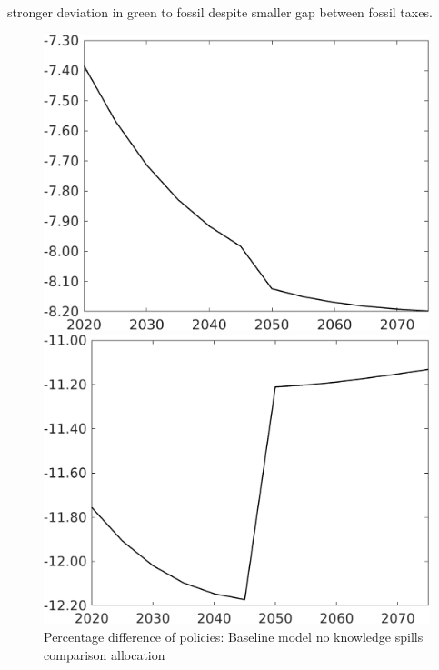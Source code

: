 \documentclass[12pt]{article}
\begin{document}
stronger deviation in green to fossil despite smaller gap between fossil taxes. 
\begin{figure}[h!!]
	\centering
	\caption{Percentage difference of policies: Baseline model no knowledge spills comparison allocation}\label{fig:Pertauf_nsk0_xgr0_noknow2}
	
	\begin{minipage}[]{0.32\textwidth}
		\includegraphics[width=1\textwidth]{../../codding_model/own_basedOnFried/optimalPol_010922_revision/figures/all_13Sept22/CompTaufPER_bytaul_Equlab_Reg0_N_spillover0_nsk0_xgr0_knspil1_sep0_LFlimit1_emsbase0_countec0_GovRev0_etaa0.79_lgd0.png}
	\end{minipage}	
	\begin{minipage}[]{0.32\textwidth}
		\includegraphics[width=1\textwidth]{../../codding_model/own_basedOnFried/optimalPol_010922_revision/figures/all_13Sept22/CompTaufPER_bytaul_Equlab_Reg0_G_spillover0_nsk0_xgr0_knspil1_sep0_LFlimit1_emsbase0_countec0_GovRev0_etaa0.79_lgd0.png}

\end{minipage}
\end{figure}
\end{document}

